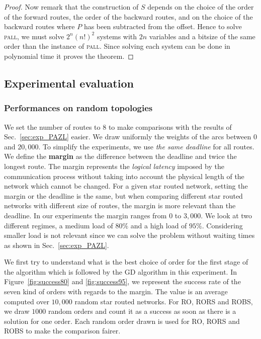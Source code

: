 \documentclass[a4paper,10pt]{article}
\newcommand\pall{\textsc{pall}\xspace}
\begin{document}
\begin{proof}
Now remark that the construction of $S$ depends on the choice of the order of the forward routes, the order of the backward routes, and on the choice of the backward routes where $P$ has been subtracted from the offset. Hence to solve \pall, we must solve $2^n(n!)^2$ systems with $2n$ variables and a bitsize of the same order than the instance of \pall. Since solving each system can be done in polynomial time it proves the theorem.
\end{proof}


    \subsection{Experimental evaluation}
    \label{sec:resultsPALL}
    \subsubsection{Performances on random topologies }
    
    We set the number of routes to $8$ to make comparisons with the results of Sec.~\ref{sec:exp_PAZL} easier. 
    We draw uniformly the weights of the arcs between $0$ and $20,000$. To simplify the experiments, 
    we use \emph{the same deadline} for all routes. We define the {\bf margin} as the difference between the deadline and twice the longest route. The margin represents the \emph{logical latency} imposed by the communication process without taking into account the physical length of the network which cannot be changed. For a given star routed network, setting the margin or the deadline is the same, but when comparing different star routed networks with different size of routes, the margin is more relevant than the deadline.
    In our experiments the margin ranges from  $0$ to $3,000$.
   We look at two different regimes, a medium load of $80\%$ and a high load of $95\%$.
   Considering smaller load is not relevant since we can solve the problem without waiting times as shown in Sec.~\ref{sec:exp_PAZL}. 
   
   We first try to understand what is the best choice of order for the first stage of the algorithm which is followed by the GD algorithm in this experiment. In Figure~\ref{fig:success80} and \ref{fig:success95}, we represent the success rate of the seven kind of orders with regards to the margin. The value is an average computed over $10,000$ random star routed networks. For RO, RORS and ROBS, we draw $1000$ random orders and count it as a success as soon as there is a solution for one order. Each random order drawn is used for RO, RORS and ROBS to make the comparison fairer.
   
\end{document}
